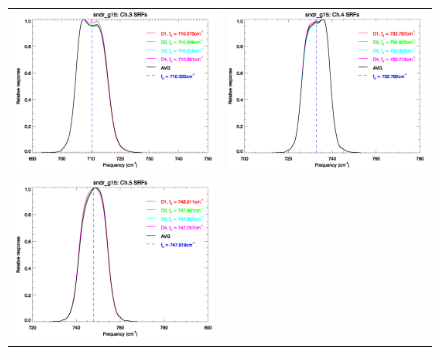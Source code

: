 \begin{figure}[htp]
\begin{tabular}{c c}
    \includegraphics[scale=0.5]{graphics/nominal/sndr_g15.ch3.srf.eps} &
    \includegraphics[scale=0.5]{graphics/nominal/sndr_g15.ch4.srf.eps} \\
    \includegraphics[scale=0.5]{graphics/nominal/sndr_g15.ch5.srf.eps} &

\end{tabular}
\end{figure}
